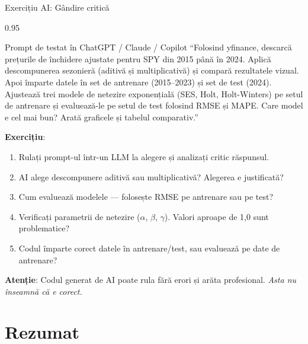 \documentclass[9pt, aspectratio=169, t]{beamer}
\begin{document}
\begin{frame}{Exercițiu AI: Gândire critică}
    \begin{cminipage}{0.95\textwidth}
    \vspace{-0.3cm}
    \begin{block}{\footnotesize Prompt de testat în ChatGPT / Claude / Copilot}
        {\footnotesize
        ``Folosind yfinance, descarcă prețurile de închidere ajustate pentru SPY din 2015 până în 2024. Aplică descompunerea sezonieră (aditivă și multiplicativă) și compară rezultatele vizual. Apoi împarte datele în set de antrenare (2015--2023) și set de test (2024). Ajustează trei modele de netezire exponențială (SES, Holt, Holt-Winters) pe setul de antrenare și evaluează-le pe setul de test folosind RMSE și MAPE. Care model e cel mai bun? Arată graficele și tabelul comparativ.''
        }
    \end{block}
    \vspace{-2mm}
    {\footnotesize
    \textbf{Exercițiu}:
    \begin{enumerate}\setlength{\itemsep}{0pt}
        \item Rulați prompt-ul într-un LLM la alegere și analizați critic răspunsul.
        \item AI alege descompunere aditivă sau multiplicativă? Alegerea e justificată?
        \item Cum evaluează modelele --- folosește RMSE pe antrenare sau pe test?
        \item Verificați parametrii de netezire ($\alpha$, $\beta$, $\gamma$). Valori aproape de 1{,}0 sunt problematice?
        \item Codul împarte corect datele în antrenare/test, sau evaluează pe date de antrenare?
    \end{enumerate}
    }
    \vspace{-2mm}
    \begin{alertblock}{}
        {\footnotesize \textbf{Atenție}: Codul generat de AI poate rula fără erori și arăta profesional. \textit{Asta nu înseamnă că e corect.}}
    \end{alertblock}
    \end{cminipage}
\end{frame}

\section{Rezumat}
\end{document}
